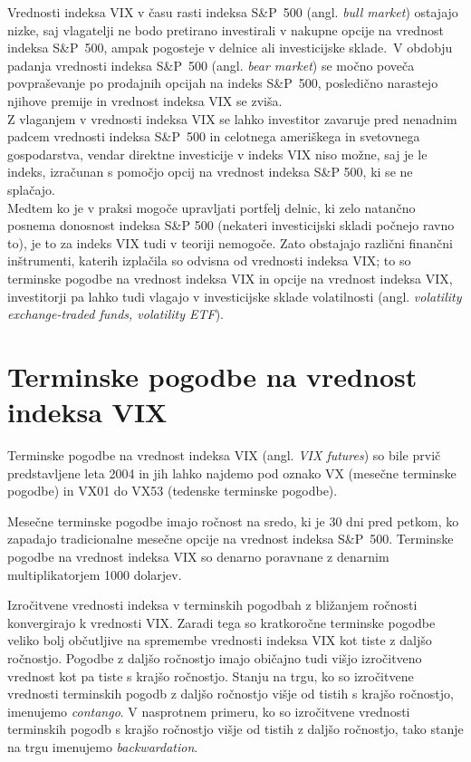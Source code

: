 \documentclass[12pt,a4paper, reqno]{amsart}
\theoremstyle{definition} %
\theoremstyle{plain} %
\begin{document}
Vrednosti indeksa VIX v času rasti indeksa S\&P~500 (angl. \textit{bull market}) ostajajo nizke, saj vlagatelji ne bodo pretirano investirali v nakupne opcije na vrednost indeksa S\&P~500, ampak pogosteje v delnice ali investicijske sklade.\
V obdobju padanja vrednosti indeksa S\&P~500 (angl. \textit{bear market}) se močno poveča povpraševanje po prodajnih opcijah na indeks S\&P~500, posledično narastejo njihove premije in vrednost indeksa VIX se zviša.\\

Z vlaganjem v vrednosti indeksa VIX se lahko investitor zavaruje pred nenadnim padcem  vrednosti indeksa S\&P~500 in celotnega ameriškega in svetovnega gospodarstva, vendar direktne investicije v indeks VIX niso možne, saj je le indeks, izračunan s pomočjo opcij na vrednost indeksa S\&P 500, ki se ne splačajo. \\

Medtem ko je v praksi mogoče upravljati portfelj delnic, ki zelo natančno posnema donosnost indeksa S\&P 500 (nekateri investicijski skladi počnejo ravno to), je to za indeks VIX tudi v teoriji nemogoče.
Zato obstajajo različni finančni inštrumenti, katerih izplačila so odvisna od vrednosti indeksa VIX; to so terminske pogodbe na vrednost indeksa VIX in opcije na vrednost indeksa VIX, investitorji pa lahko tudi vlagajo v investicijske sklade volatilnosti (angl. \textit{volatility exchange-traded funds, volatility ETF}).



\section{Terminske pogodbe na vrednost indeksa VIX}
Terminske pogodbe na vrednost indeksa VIX (angl. \textit{VIX futures}) so bile prvič predstavljene leta 2004 in jih lahko najdemo pod oznako VX (mesečne terminske pogodbe) in VX01 do VX53 (tedenske terminske pogodbe).\

Mesečne terminske pogodbe imajo ročnost na sredo, ki je 30 dni pred petkom, ko zapadajo tradicionalne mesečne opcije na vrednost indeksa S\&P~500.
Terminske pogodbe na vrednost indeksa VIX so denarno poravnane z denarnim multiplikatorjem 1000 dolarjev.

Izročitvene vrednosti indeksa v terminskih pogodbah z bližanjem ročnosti konvergirajo k vrednosti VIX. Zaradi tega so kratkoročne terminske pogodbe veliko bolj občutljive na spremembe vrednosti indeksa VIX kot tiste z daljšo ročnostjo. Pogodbe z daljšo ročnostjo imajo običajno tudi višjo izročitveno vrednost kot pa tiste s krajšo ročnostjo. Stanju na trgu, ko so izročitvene vrednosti terminskih pogodb z daljšo ročnostjo višje od tistih s krajšo ročnostjo, imenujemo \textit{contango}. V nasprotnem primeru, ko so izročitvene vrednosti terminskih pogodb s krajšo ročnostjo višje od tistih z daljšo ročnostjo, tako stanje na trgu imenujemo \textit{backwardation}.\\
\end{document}
